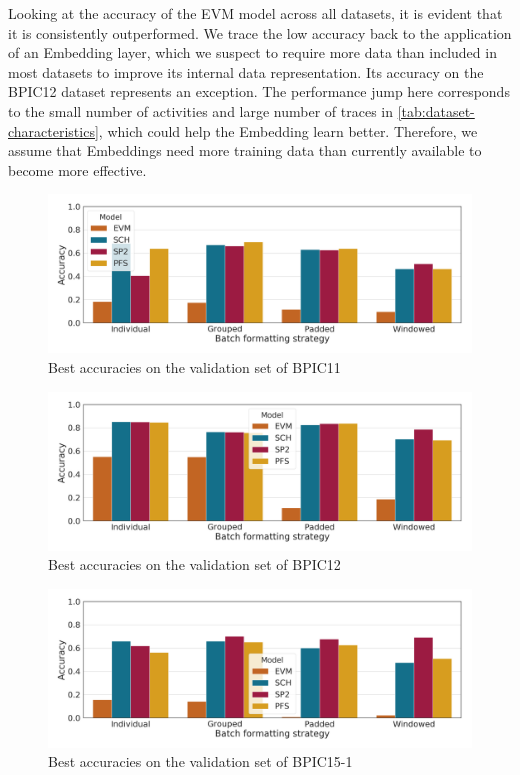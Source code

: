 Looking at the accuracy of the EVM model across all datasets, it is evident that it is consistently outperformed. We trace the low accuracy back to the application of an Embedding layer, which we suspect to require more data than included in most datasets to improve its internal data representation.
Its accuracy on the BPIC12 dataset represents an exception. The performance jump here corresponds to the small number of activities and large number of traces in \autoref{tab:dataset-characteristics}, which could help the Embedding learn better. Therefore, we assume that Embeddings need more training data than currently available to become more effective.

\begin{figure}
    \centering
    \includegraphics[width=\textwidth]{gfx/bpic2011/accuracies.png}
    \caption{Best accuracies on the validation set of BPIC11}
    \label{fig:max-accuracies-bpic2011}
\end{figure}
\begin{figure}
    \centering
    \includegraphics[width=\textwidth]{gfx/bpic2012/accuracies.png}
    \caption{Best accuracies on the validation set of BPIC12}
    \label{fig:max-accuracies-bpic2012}
\end{figure}
\begin{figure}
    \centering
    \includegraphics[width=\textwidth]{gfx/bpic2015_1/accuracies.png}
    \caption{Best accuracies on the validation set of BPIC15-1}
    \label{fig:max-accuracies-bpic2015-1}
\end{figure}
